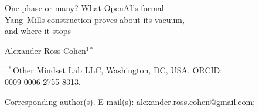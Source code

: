 \documentclass[11pt,a4paper]{article}
\theoremstyle{plain}
\begin{document}
\thispagestyle{plain}
\vspace*{2.5cm}
\begin{center}
{\LARGE One phase or many? What OpenAI's formal\\[4pt] Yang--Mills construction proves about its vacuum,\\[4pt] and where it stops\par}
\vspace{1.6em}
{\large Alexander Ross Cohen$^{1*}$\par}
\vspace{1.2em}
{\normalsize $^{1*}$Other Mindset Lab LLC, Washington, DC, USA. ORCID:\\ 0009-0006-2755-8313.\par}
\vspace{2em}
{\normalsize Corresponding author(s). E-mail(s): \href{mailto:alexander.ross.cohen@gmail.com}{alexander.ross.cohen@gmail.com};\par}
\end{center}
\vspace{1.5em}
\end{document}
